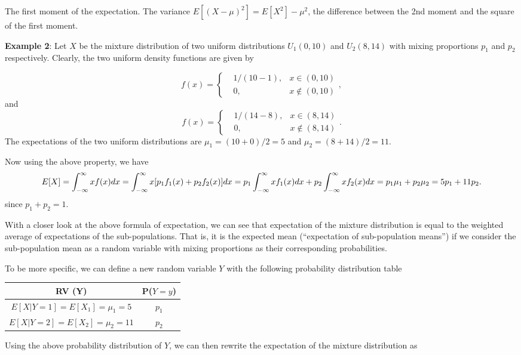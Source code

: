 \documentclass[
]{book}
\begin{document}
The first moment of the expectation. The variance \(E[(X-\mu)^2] = E[X^2] - \mu^2\), the difference between the 2nd moment and the square of the first moment.

\hfill\break

\textbf{Example 2}: Let \(X\) be the mixture distribution of two uniform distributions \(U_1(0, 10)\) and \(U_2(8, 14)\) with mixing proportions \(p_1\) and \(p_2\) respectively. Clearly, the two uniform density functions are given by

\[
f(x) = \left\{\begin{aligned}
& 1/(10-1), & x \in (0,10)\\
&0, &  x \notin (0,10)
\end{aligned},
\right.
\]
and
\[
f(x) = \left\{\begin{aligned}
& 1/(14-8), & x \in (8,14)\\
&0, &  x \notin (8,14)
\end{aligned}.
\right.
\]
The expectations of the two uniform distributions are \(\mu_1 = (10 + 0)/2 = 5\) and \(\mu_2 = (8 + 14) / 2 = 11\).

Now using the above property, we have
\[
E[X] = \int_{-\infty}^\infty xf(x)dx = \int_{-\infty}^\infty x[p_1f_1(x) + p_2f_2(x)]dx \\ = p_1\int_{-\infty}^\infty xf_1(x)dx + p_2\int_{-\infty}^\infty xf_2(x)dx = p_1\mu_1 +p_2\mu_2 = 5p_1 + 11p_2.
\]
since \(p_1 + p_2 = 1\).

With a closer look at the above formula of expectation, we can see that expectation of the mixture distribution is equal to the weighted average of expectations of the sub-populations. That is, it is the expected mean (``expectation of sub-population means'') if we consider the sub-population mean as a random variable with mixing proportions as their corresponding probabilities.

To be more specific, we can define a new random variable \(Y\) with the following probability distribution table

\begin{longtable}[]{@{}cc@{}}
\toprule\noalign{}
RV (Y) & P(\(Y=y\)) \\
\midrule\noalign{}
\endhead
\bottomrule\noalign{}
\endlastfoot
\(E[X|Y=1] = E[X_1] = \mu_1 = 5\) & \(p_1\) \\
\(E[X|Y=2] = E[X_2] = \mu_2 = 11\) & \(p_2\) \\
\end{longtable}

Using the above probability distribution of \(Y\), we can then rewrite the expectation of the mixture distribution as
\end{document}
